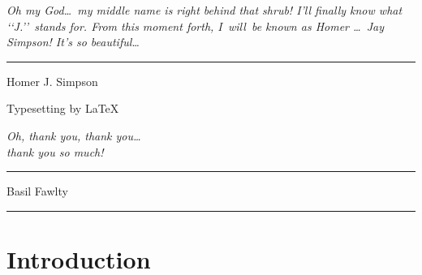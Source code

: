 \documentclass{book}
\begin{document}
\pagestyle{plain}
\renewcommand{\thepage}{\roman{page}}





\newpage
\thispagestyle{empty}
\mbox{}
\newpage

\thispagestyle{empty}

\vspace*{\fill} \hfill \hspace{5mm}
\begin{minipage}[b]{7cm}
\sf \textsl{Oh my God\ldots\ my middle name is right behind that shrub!
I'll finally know what \lq\lq J.\rq\rq\ stands for.  From this moment forth,
\mbox{I will}\ be known as Homer \ldots\ Jay Simpson! It's so beautiful\ldots}

\hfill \rule{5cm}{0.5pt}
\vspace{4pt}

\hfill Homer J. Simpson
\end{minipage}

\newpage
\thispagestyle{empty}

\vfill\hfill
\textsf{Typesetting by \LaTeX}

\newpage


\thispagestyle{empty}

\hfill
\begin{minipage}[t]{5cm} \flushright
\sf \textsl{Oh, thank you, thank you\ldots\\ thank you so much!}

\rule{3.5cm}{0.5pt} \vspace{3pt}

Basil Fawlty
\end{minipage}


\vspace{\fill}

\hfill \rule{0.5pt}{12.8cm} \hspace{5mm}
\begin{minipage}[b]{10.5cm}
\sf

\end{minipage}




\tableofcontents

\chapter{Introduction}
\renewcommand{\thepage}{\arabic{page}}
\setcounter{page}{1}

\end{document}
